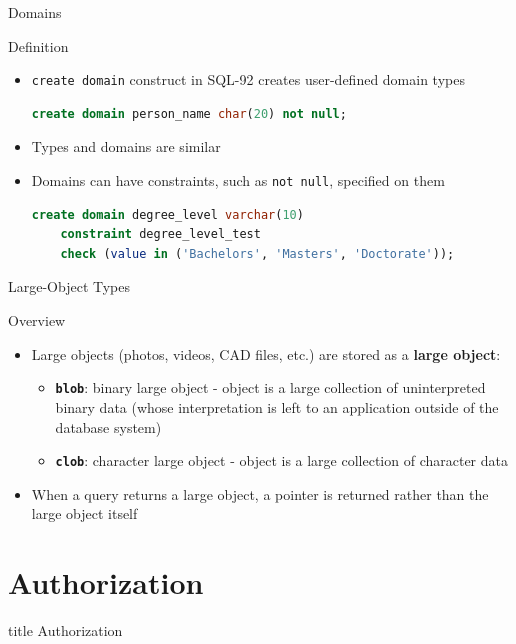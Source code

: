 \documentclass[aspectratio=169, xcolor=dvipsnames]{beamer}
\begin{document}
\begin{frame}[fragile]{Domains}
    \begin{block}{Definition}
        \begin{itemize}[<+->]
            \item \texttt{create domain} construct in SQL-92 creates user-defined domain types 
            \begin{lstlisting}[language=SQL]
create domain person_name char(20) not null;
            \end{lstlisting}
            \item Types and domains are similar
            \item Domains can have constraints, such as \texttt{not null}, specified on them
            \begin{lstlisting}[language=SQL, basicstyle=\ttfamily\scriptsize]
create domain degree_level varchar(10) 
    constraint degree_level_test 
    check (value in ('Bachelors', 'Masters', 'Doctorate'));
            \end{lstlisting}
        \end{itemize}
    \end{block}
\end{frame}

\begin{frame}{Large-Object Types}
    \begin{block}{Overview}
        \begin{itemize}[<+->]
            \item Large objects (photos, videos, CAD files, etc.) are stored as a \textbf{large object}:
            \begin{itemize}
                \item[$\triangleright$] \textbf{\texttt{blob}}: binary large object - object is a large collection of uninterpreted binary data (whose interpretation is left to an application outside of the database system)
                \item[$\triangleright$] \textbf{\texttt{clob}}: character large object - object is a large collection of character data
            \end{itemize}
            \item When a query returns a large object, a pointer is returned rather than the large object itself
        \end{itemize}
    \end{block}
\end{frame}

\section{Authorization}
\begin{frame}
  \vfill
  \centering
  \begin{beamercolorbox}[sep=8pt,center,shadow=true,rounded=true]{title}
    Authorization\par%
  \end{beamercolorbox}
  \vfill
\end{frame}
\end{document}
